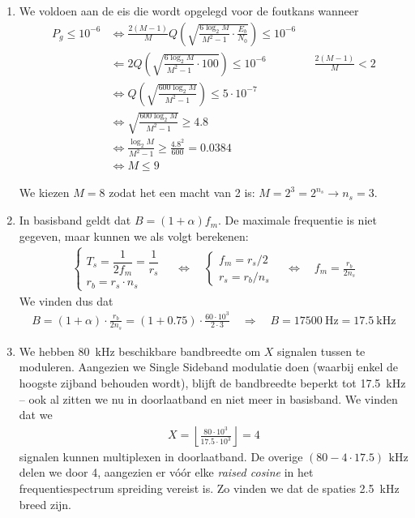\documentclass[kulak]{kulakarticle}
\begin{document}
	\begin{enumerate}
		\item	We voldoen aan de eis die wordt opgelegd voor de foutkans wanneer \begin{align*}
			P_g \leq 10^{-6} & \Longleftrightarrow \frac{2(M-1)}{M} Q \left( \sqrt{\frac{6 \log_2 M}{M^2 - 1} \cdot \frac{E_b}{N_0}} \right) \leq 10^{-6} \\
			& \Longleftarrow 2 Q \left( \sqrt{\frac{6 \log_2 M}{M^2 - 1} \cdot 100} \right) \leq 10^{-6} && \frac{2(M-1)}{M} < 2 \\
			& \Longleftrightarrow Q \left( \sqrt{\frac{600 \log_2 M}{M^2 - 1}} \right) \leq 5 \cdot 10^{-7} \\
			& \Longleftrightarrow \sqrt{\frac{600 \log_2 M}{M^2 - 1}} \geq 4.8  \\
			& \Longleftrightarrow \frac{\log_2 M}{M^2 - 1} \geq \frac{4.8^2}{600} = 0.0384 \\
			& \Longleftrightarrow M \leq 9
		\end{align*}

		We kiezen \(M=8\) zodat het een macht van 2 is: \(M=2^3 = 2^{n_s} \rightarrow n_s=3\).

		\item In basisband geldt dat \(B = (1 + \alpha)f_m\). De maximale frequentie is niet gegeven, maar kunnen we als volgt berekenen: \begin{align*}
			\left\{ \begin{array}{l}
				T_s = \dfrac{1}{2f_m} = \dfrac{1}{r_s} \\
				r_b = r_s \cdot n_s
			\end{array} \right. \quad \Longleftrightarrow \quad \left\{ \begin{array}{l}
			f_m = r_s/2 \\
			r_s = r_b/n_s
			\end{array} \right. \quad \Longleftrightarrow \quad f_m = \frac{r_b}{2n_s}
		\end{align*}
		We vinden dus dat \begin{align*}
			B = (1+\alpha)\cdot\frac{r_b}{2n_s} = (1+0.75)\cdot\frac{60 \cdot 10^3}{2 \cdot 3} \quad \Longrightarrow \quad B = \SI{17500}{\hertz} =  \SI{17.5}{\kilo\hertz}
		\end{align*}

		\item We hebben \SI{80}{\kilo\hertz} beschikbare bandbreedte om \(X\) signalen tussen te moduleren. Aangezien we Single Sideband modulatie doen (waarbij enkel de hoogste zijband behouden wordt), blijft de bandbreedte beperkt tot \SI{17.5}{\kilo\hertz} -- ook al zitten we nu in doorlaatband en niet meer in basisband. We vinden dat we \begin{align*}
			X = \left\lfloor \frac{80 \cdot 10^3}{17.5 \cdot 10^3} \right\rfloor = 4
		\end{align*} signalen kunnen multiplexen in doorlaatband. De overige \((80 - 4 \cdot 17.5) \, \SI{}{\kilo\hertz}\) delen we door 4, aangezien er vóór elke \textit{raised cosine} in het frequentiespectrum spreiding vereist is. Zo vinden we dat de spaties \SI{2.5}{\kilo\hertz} breed zijn.


\end{enumerate}
\end{document}
